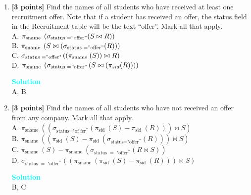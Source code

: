 \documentclass[10pt]{article}
\newenvironment{solution}
    { \begin{mdframed}[backgroundcolor=gray!10] \textcolor{cyan}{\textbf{Solution}} \\}
    {  \end{mdframed}}
\begin{document}
\begin{enumerate}
\item \textbf{[3 points]} Find the names of all students who have received at
least one recruitment offer. Note that if a student has received an
offer, the status field in the Recruitment table will be the text
\textquotedblleft offer\textquotedblright . Mark all that apply.\\
A. $\pi_{\text{sname }}\left(\sigma_{\text{status }="\text{offer}"}(S\bowtie R)\right)$\\
B. $\pi_{\text{sname }}\left(S\bowtie\left(\sigma_{\text{status }="\text{offer}"}(R)\right)\right)$\\
C. $\sigma_{\text{status }="\text{\text{offer}"}}\left(\left(\pi_{\text{sname }}(S)\right)\bowtie R\right)$\\
D. $\pi_{\text{sname }}\left(\sigma_{\text{status }="\text{offer}"}\left(S\bowtie\left(\pi_{sid}(R)\right)\right)\right)$\\
\begin{solution}
A, B
\end{solution}

\item \textbf{[3 points]} Find the names of all students who have not received
an offer from any company. Mark all that apply.\\
A. $\pi_{\text{sname }}\left(\left(\sigma_{\text{status="of fer}^{\prime\prime}}\left(\pi_{\text{sid }}(S)-\pi_{\text{sid }}(R)\right)\right)\bowtie S\right)$\\
B. $\pi_{\text{sname }}\left(\left(\pi_{\text{sid }}(S)-\pi_{\text{sid }}\left(\sigma_{\text{status="offer}^{\prime\prime}}(R)\right)\right)\bowtie S\right)$\\
C. $\pi_{\text{sname }}(S)-\pi_{\text{sname }}\left(\sigma_{\text{status }=\text{ "offer}^{\prime\prime}}(R\bowtie S)\right)$\\
D. $\sigma_{\text{status }=\text{ "offer}^{\prime\prime}}\left(\left(\pi_{\text{sname }}\left(\pi_{\text{sid }}(S)-\pi_{\text{sid }}(R)\right)\right)\bowtie S\right)$\\
\begin{solution}
B, C
\end{solution}


\end{enumerate}
\end{document}
